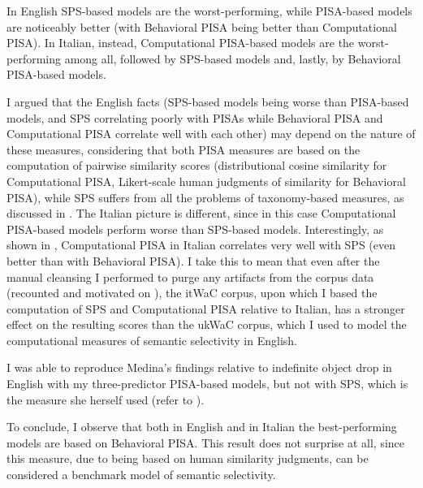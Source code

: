 In English SPS-based models are the worst-performing, while PISA-based models are noticeably better (with Behavioral PISA being better than Computational PISA). In Italian, instead, Computational PISA-based models are the worst-performing among all, followed by SPS-based models and, lastly, by Behavioral PISA-based models.

 I argued that the English facts (SPS-based models being worse than PISA-based models, and SPS correlating poorly with PISAs while Behavioral PISA and Computational PISA correlate well with each other) may depend on the nature of these measures, considering that both PISA measures are based on the computation of pairwise similarity scores (distributional cosine similarity for Computational PISA, Likert-scale human judgments of similarity for Behavioral PISA), while SPS suffers from all the problems of taxonomy-based measures, as discussed in . The Italian picture is different, since in this case Computational PISA-based models perform worse than SPS-based models. Interestingly, as shown in , Computational PISA in Italian correlates very well with SPS (even better than with Behavioral PISA). I take this to mean that even after the manual cleansing I performed to purge any artifacts from the corpus data (recounted and motivated on ), the itWaC corpus, upon which I based the computation of SPS and Computational PISA relative to Italian, has a stronger effect on the resulting scores than the ukWaC corpus, which I used to model the computational measures of semantic selectivity in English.
 
 I was able to reproduce Medina's findings relative to indefinite object drop in English with my three-predictor PISA-based models, but not with SPS, which is the measure she herself used (refer to ).
 
 To conclude, I observe that both in English and in Italian the best-performing models are based on Behavioral PISA. This result does not surprise at all, since this measure, due to being based on human similarity judgments, can be considered a benchmark model of semantic selectivity.

